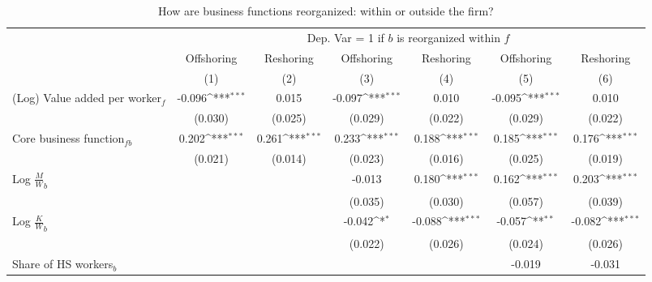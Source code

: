 \begin{table}[htbp] \footnotesize \centering
\def\sym#1{\ifmmode^{#1}\else\(^{#1}\)\fi}
\caption{How are business functions reorganized: within or outside the firm? \label{tab:reg_how_paper}}
\renewcommand{\arraystretch}{1}
\begin{tabular}{l*{6}{c}}
\toprule
&\multicolumn{6}{c}{Dep. Var = 1 if $ b $ is reorganized within $ f $} \\
\cmidrule(lr){2-7}
                &\multicolumn{1}{c}{Offshoring}&\multicolumn{1}{c}{Reshoring}&\multicolumn{1}{c}{Offshoring}&\multicolumn{1}{c}{Reshoring}&\multicolumn{1}{c}{Offshoring}&\multicolumn{1}{c}{Reshoring}\\\cmidrule(lr){2-2}\cmidrule(lr){3-3}\cmidrule(lr){4-4}\cmidrule(lr){5-5}\cmidrule(lr){6-6}\cmidrule(lr){7-7}
                &\multicolumn{1}{c}{(1)}         &\multicolumn{1}{c}{(2)}         &\multicolumn{1}{c}{(3)}         &\multicolumn{1}{c}{(4)}         &\multicolumn{1}{c}{(5)}         &\multicolumn{1}{c}{(6)}         \\
\midrule
(Log) Value added per worker$ _f$&   -0.096\sym{***}&    0.015         &   -0.097\sym{***}&    0.010         &   -0.095\sym{***}&    0.010         \\
                &  (0.030)         &  (0.025)         &  (0.029)         &  (0.022)         &  (0.029)         &  (0.022)         \\
\addlinespace
Core business function$ _{fb}$&    0.202\sym{***}&    0.261\sym{***}&    0.233\sym{***}&    0.188\sym{***}&    0.185\sym{***}&    0.176\sym{***}\\
                &  (0.021)         &  (0.014)         &  (0.023)         &  (0.016)         &  (0.025)         &  (0.019)         \\
\addlinespace
Log $\frac{M}{W}_b$&                  &                  &   -0.013         &    0.180\sym{***}&    0.162\sym{***}&    0.203\sym{***}\\
                &                  &                  &  (0.035)         &  (0.030)         &  (0.057)         &  (0.039)         \\
\addlinespace
Log $\frac{K}{W}_b$&                  &                  &   -0.042\sym{*}  &   -0.088\sym{***}&   -0.057\sym{**} &   -0.082\sym{***}\\
                &                  &                  &  (0.022)         &  (0.026)         &  (0.024)         &  (0.026)         \\
\addlinespace
Share of HS workers$ _b$&                  &                  &                  &                  &   -0.019         &   -0.031         \\

\end{tabular}
\end{table}
